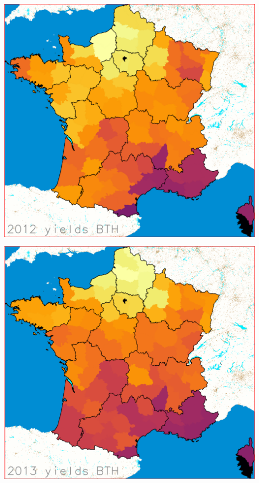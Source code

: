 \documentclass[landscape]{slides}
\begin{document}
\begin{slide} 
\includegraphics[width=\textwidth]{y2012}
\end{slide}
\begin{slide} 
\includegraphics[width=\textwidth]{y2013}
\end{slide}
\end{document}
